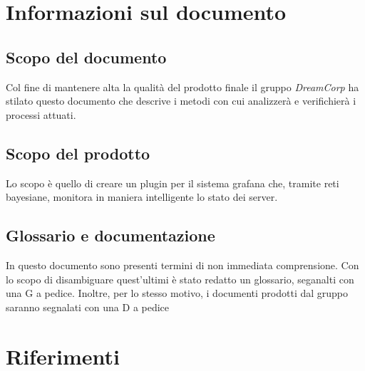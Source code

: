 \section{Informazioni sul documento}
\subsection{Scopo del documento}
 Col fine di mantenere alta la qualità del prodotto finale il gruppo \textit{DreamCorp} ha stilato questo documento che descrive i metodi con cui analizzerà e verifichierà i processi attuati. 
 \subsection{Scopo del prodotto}
 Lo scopo è quello di creare un plugin per il sistema grafana che, tramite reti bayesiane, monitora in maniera intelligente lo stato dei server.
 \subsection{Glossario e documentazione}
 In questo documento sono presenti termini di non immediata comprensione. Con lo scopo di disambiguare quest'ultimi è stato redatto un glossario, seganalti con una G a pedice.
 Inoltre, per lo stesso motivo, i documenti prodotti dal gruppo saranno segnalati con una D a pedice
 \section{Riferimenti}